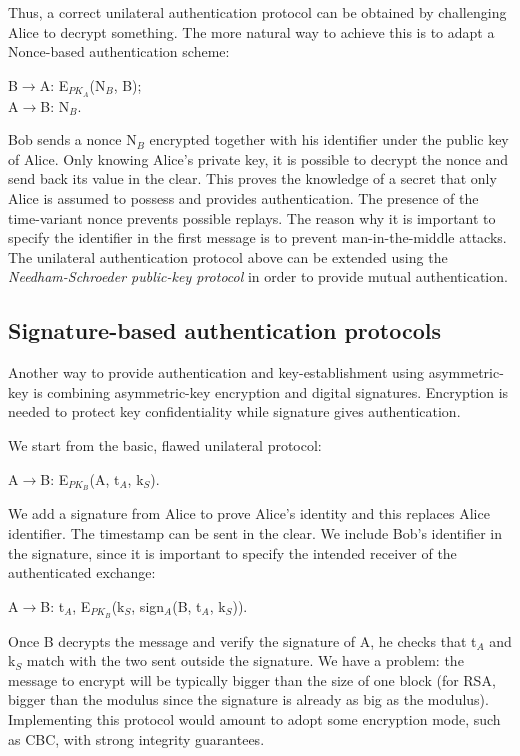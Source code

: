 \documentclass[a4paper, 12pt]{report}
\begin{document}
Thus, a correct unilateral authentication protocol can be obtained by challenging Alice to decrypt something. The more natural way to achieve this is to adapt a Nonce-based authentication scheme:
\begin{center}
	B$\rightarrow$A: E$_{PK_A}$(N$_B$, B);\\
	A$\rightarrow$B: N$_B$.
\end{center}
Bob sends a nonce N$_B$ encrypted together with his identifier under the public key of Alice. Only knowing Alice's private key, it is possible to decrypt the nonce and send back its value in the clear. This proves the knowledge of a secret that only Alice is assumed to possess and provides authentication. The presence of the time-variant nonce prevents possible replays. The reason why it is important to specify the identifier in the first message is to prevent man-in-the-middle attacks. The unilateral authentication protocol above can be extended using the \textit{Needham-Schroeder public-key protocol} in order to provide mutual authentication.

\subsection*{Signature-based authentication protocols}
Another way to provide authentication and key-establishment using asymmetric-key is combining asymmetric-key encryption and digital signatures. Encryption is needed to protect key confidentiality while signature gives authentication.

We start from the basic, flawed unilateral protocol:
\begin{center}
	A$\rightarrow$B: E$_{PK_B}$(A, t$_A$, k$_S$).
\end{center} 
We add a signature from Alice to prove Alice's identity and this replaces Alice identifier. The timestamp can be sent in the clear. We include Bob's identifier in the signature, since it is important to specify the intended receiver of the authenticated exchange:
\begin{center}
	A$\rightarrow$B: t$_A$, E$_{PK_B}$(k$_S$, sign$_A$(B, t$_A$, k$_S$)).
\end{center}
Once B decrypts the message and verify the signature of A, he checks that t$_A$ and k$_S$ match with the two sent outside the signature. We have a problem: the message to encrypt will be typically bigger than the size of one block (for RSA, bigger than the modulus since the signature is already as big as the modulus). Implementing this protocol would amount to adopt some encryption mode, such as CBC, with strong integrity guarantees.
\end{document}
